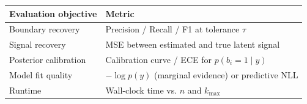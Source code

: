 \begin{tabular}{ll}\toprule
Evaluation objective & Metric\\\midrule
Boundary recovery & Precision / Recall / F1 at tolerance $\tau$\\
Signal recovery & MSE between estimated and true latent signal\\
Posterior calibration & Calibration curve / ECE for $p(b_i=1\mid y)$\\
Model fit quality & $-\log p(y)$ (marginal evidence) or predictive NLL\\
Runtime & Wall-clock time vs. $n$ and $k_{\max}$\\\bottomrule
\end{tabular}
